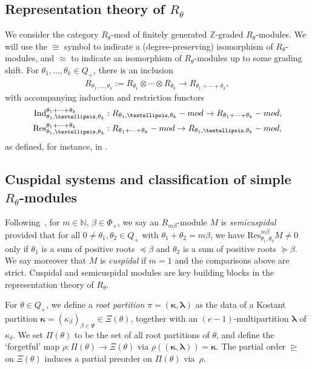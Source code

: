 \documentclass[Unicode,ALCO]{cedram}
\newcommand{\0}{{\bar 0}}
\newcommand{\Ind}{{\mathrm {Ind}}}
\newcommand{\Res}{{\mathrm {Res}}}
\newcommand{\ZZ}{{\mathbb Z}}
\newcommand{\NN}{{\mathbb N}}
\newcommand{\blam}{\boldsymbol{\lambda}}
\newcommand{\bkap}{\boldsymbol{\kappa}}
\begin{document}
\subsection{Representation theory of \texorpdfstring{\(R_\theta\)}{R theta}}
We consider the category \(R_\theta\)-mod of finitely generated \(\ZZ\)-graded \(R_\theta\)-modules. We will use the \(\cong\) symbol to indicate a (degree-preserving) isomorphism of \(R_\theta\)-modules, and \(\approx\) to indicate an isomorphism of \(R_\theta\)-modules up to some grading shift.
For \(\theta_1,\ldots, \theta_k \in Q_+\), there is an inclusion 
\begin{align*}
R_{\theta_1, \ldots, \theta_k}:=R_{\theta_1} \otimes \cdots \otimes  R_{\theta_k} \to R_{\theta_1 + \cdots + \theta_k}, 
\end{align*} 
with accompanying induction and restriction functors
\begin{align*}
\Ind_{\theta_1,\ldots, \theta_k}^{\theta_1 + \cdots + \theta_k}: & \;R_{\theta_1, \ldots, \theta_k}\textup{-mod} \to R_{\theta_1 + \cdots + \theta_k}\textup{-mod},\\
\Res_{\theta_1,\ldots, \theta_k}^{\theta_1 + \cdots + \theta_k}: & \;R_{\theta_1 + \cdots + \theta_k}\textup{-mod} \to R_{\theta_1, \ldots, \theta_k}\textup{-mod},
\end{align*}
as defined, for instance, in \cite{KhoLauDiagCat1}.


\subsection{Cuspidal systems and classification of simple \texorpdfstring{\(R_\theta\)}{R theta}-modules}\label{stratasec}
Following~\cite{KlCuspSys, McNRepKLR3, KlMuStrat, TiWebMirk}, for \(m \in \NN\), \(\beta \in \Phi_+\), we say an \(R_{m\beta}\)-module \(M\) is {\em semicuspidal} provided that for all \(0 \neq \theta_1, \theta_2 \in Q_+\) with \(\theta_1 + \theta_2 = m\beta\), we have \(\Res_{\theta_1, \theta_2}^{m\beta} M \neq 0\) only if \(\theta_1\) is a sum of positive roots \(\preceq \beta\) and \(\theta_2\) is a sum of positive roots \(\succeq \beta\). We say moreover that \(M\) is {\em cuspidal} if \(m=1\) and the comparisons above are strict.
Cuspidal and semicuspidal modules are key building blocks in the representation theory of \(R_\theta\). 

For \(\theta \in Q_+\), we define a {\em root partition} \(\pi = (\bkap, \blam)\) as the data of a Kostant partition \(\bkap = (\kappa_\beta)_{\beta \in \Psi}\in \Xi(\theta)\), together with 
an \((e-1)\)-multipartition \(\blam\) of \(\kappa_\delta\). We set \(\Pi(\theta)\) to be the set of all root partitions of \(\theta\), and define the `forgetful' map \(\rho:\Pi(\theta) \to \Xi(\theta)\) via \(\rho((\bkap, \blam)) = \bkap\). The partial order \(\trianglerighteq\) on \(\Xi(\theta)\) induces a partial preorder on \(\Pi(\theta)\) via~\(\rho\).
\end{document}
